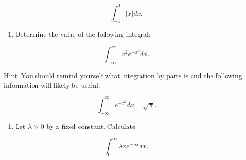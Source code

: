 \documentclass[
]{article}
\providecommand{\tightlist}{%
  \setlength{\itemsep}{0pt}\setlength{\parskip}{0pt}}
\begin{document}
\[\int_{-1}^{1} | x | dx.\]

\begin{enumerate}
\def\labelenumi{\arabic{enumi}.}
\setcounter{enumi}{6}
\tightlist
\item
  Determine the value of the following integral:
\end{enumerate}

\[ \int_{-\infty}^{\infty} x^2 e^{-x^2} dx.\]

Hint: You should remind yourself what integration by parts is and the following information will likely be useful:

\[\int_{-\infty}^{\infty} e^{-x^2} dx = \sqrt{\pi}.\]

\begin{enumerate}
\def\labelenumi{\arabic{enumi}.}
\setcounter{enumi}{7}
\tightlist
\item
  Let \(\lambda > 0\) by a fixed constant. Calculate
\end{enumerate}

\[\int_{0}^{\infty} \lambda x e^{-\lambda x}dx.\]
\end{document}
